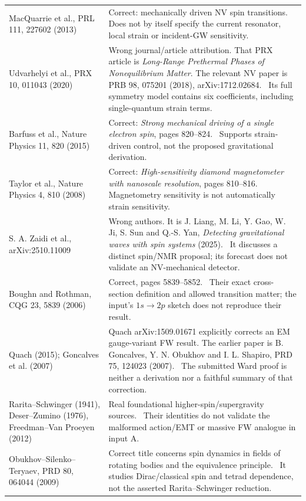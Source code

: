 \documentclass[a4paper,11pt]{article}
\begin{document}
\begin{longtable}{@{}P{42mm}P{113mm}@{}}
MacQuarrie et al., PRL 111, 227602 (2013) & Correct: mechanically driven NV spin transitions.~\cite{macquarrie} Does not by itself specify the current resonator, local strain or incident-GW sensitivity.\\
Udvarhelyi et al., PRX 10, 011043 (2020) & Wrong journal/article attribution. That PRX article is \emph{Long-Range Prethermal Phases of Nonequilibrium Matter}. The relevant NV paper is PRB 98, 075201 (2018), arXiv:1712.02684.~\cite{udvarhelyi} Its full symmetry model contains six coefficients, including single-quantum strain terms.\\
Barfuss et al., Nature Physics 11, 820 (2015) & Correct: \emph{Strong mechanical driving of a single electron spin}, pages 820--824.~\cite{barfuss} Supports strain-driven control, not the proposed gravitational derivation.\\
Taylor et al., Nature Physics 4, 810 (2008) & Correct: \emph{High-sensitivity diamond magnetometer with nanoscale resolution}, pages 810--816.~\cite{taylor} Magnetometry sensitivity is not automatically strain sensitivity.\\
S. A. Zaidi et al., arXiv:2510.11009 & Wrong authors. It is J. Liang, M. Li, Y. Gao, W. Ji, S. Sun and Q.-S. Yan, \emph{Detecting gravitational waves with spin systems} (2025).~\cite{liang} It discusses a distinct spin/NMR proposal; its forecast does not validate an NV-mechanical detector.\\
Boughn and Rothman, CQG 23, 5839 (2006) & Correct, pages 5839--5852.~\cite{boughn} Their exact cross-section definition and allowed transition matter; the input's $1s\to2p$ sketch does not reproduce their result.\\
Quach (2015); Goncalves et al. (2007) & Quach arXiv:1509.01671 explicitly corrects an EM gauge-variant FW result. The earlier paper is B. Goncalves, Y. N. Obukhov and I. L. Shapiro, PRD 75, 124023 (2007).~\cite{quach,goncalves} The submitted Ward proof is neither a derivation nor a faithful summary of that correction.\\
Rarita--Schwinger (1941), Deser--Zumino (1976), Freedman--Van Proeyen (2012) & Real foundational higher-spin/supergravity sources.~\cite{rarita,deser,supergravity} Their identities do not validate the malformed action/EMT or massive FW analogue in input A.\\
Obukhov--Silenko--Teryaev, PRD 80, 064044 (2009) & Correct title concerns spin dynamics in fields of rotating bodies and the equivalence principle.~\cite{obukhov} It studies Dirac/classical spin and tetrad dependence, not the asserted Rarita--Schwinger reduction.\\
\bottomrule\end{longtable}
\end{document}
